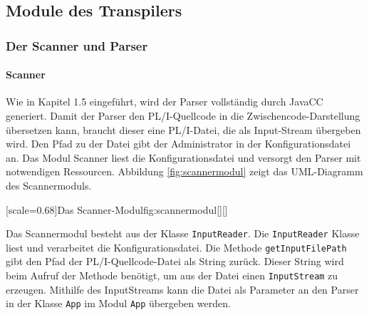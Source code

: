 
 \pagebreak
\subsection{Module des Transpilers}

\subsubsection{Der Scanner und Parser}
\paragraph*{Scanner}
Wie in Kapitel 1.5 eingeführt, wird der Parser vollständig durch 
JavaCC generiert.
Damit der Parser den PL/I-Quellcode in die Zwischencode-Darstellung übersetzen kann,
braucht dieser eine PL/I-Datei, die als Input-Stream übergeben wird.
Den Pfad zu der Datei gibt der Administrator in der Konfigurationsdatei an.
Das Modul Scanner liest die Konfigurationsdatei und versorgt den Parser mit notwendigen Ressourcen.
Abbildung \ref{fig:scannermodul} zeigt das UML-Diagramm des Scannermoduls.

[scale=0.68]{Das Scanner-Modul}{fig:scannermodul}[][]

Das Scannermodul besteht aus der Klasse \verb+InputReader+. 
Die \verb+InputReader+ Klasse liest und verarbeitet die Konfigurationsdatei. Die Methode \verb+getInputFilePath+ gibt den Pfad der PL/I-Quellcode-Datei als String zurück.
Dieser String wird beim Aufruf der  Methode benötigt, um aus der Datei einen \verb+InputStream+ zu erzeugen.
Mithilfe des InputStreams kann die Datei als Parameter an den Parser in der Klasse \verb+App+ im Modul \verb+App+
übergeben werden. 

